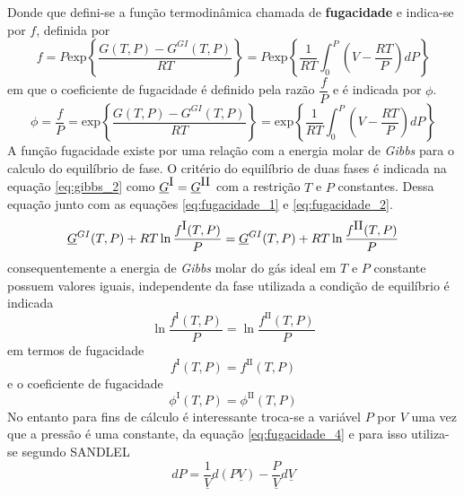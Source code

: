 Donde que defini-se a função termodinâmica chamada de \textbf{fugacidade} e indica-se por $f$, definida por
\begin{equation}\label{eq:fugacidade_1}
f=P\mbox{exp}\left\{\dfrac{G(T,P)-G^{GI}(T,P)}{RT}\right\} =P\mbox{exp}\left\{\dfrac{1}{RT}\int_{0}^{P}\left(V-\dfrac{RT}{P}\right)dP\right\}
\end{equation}
em que o coeficiente de fugacidade é definido pela razão $\dfrac{f}{P}$ e é indicada por $\phi$.
\begin{equation}\label{eq:fugacidade_2}
\phi=\dfrac{f}{P}=\mbox{exp}\left\{\dfrac{G(T,P)-G^{GI}(T,P)}{RT}\right\} =\mbox{exp}\left\{\dfrac{1}{RT}\int_{0}^{P}\left(V-\dfrac{RT}{P}\right)dP\right\}
\end{equation}
A função fugacidade existe por uma relação com a energia molar de \textit{Gibbs} para o calculo do equilíbrio de fase. O critério do equilíbrio de duas fases é indicada na equação \ref{eq:gibbs_2} como $\underline{G}^{\mbox{I}}=\underline{G}^{\mbox{II}}$ com a restrição $T$ e $P$ constantes. Dessa equação junto com as equações \ref{eq:fugacidade_1} e \ref{eq:fugacidade_2}. 
\begin{equation}\label{eq:fugacidade_3}
\underline{G}^{GI}(T,P) + RT\ln\dfrac{f^{\mbox{I}}(T,P)}{P} = \underline{G}^{GI}(T,P) + RT\ln\dfrac{f^{\mbox{II}}(T,P)}{P}
\end{equation}
consequentemente a energia de \textit{Gibbs} molar do gás ideal em $T$ e $P$ constante possuem valores iguais, independente da fase utilizada a condição de equilíbrio é indicada
\begin{equation}\label{eq:fugacidade_4}
\ln\dfrac{f^{\mbox{I}}(T,P)}{P} = \ln\dfrac{f^{\mbox{II}}(T,P)}{P}
\end{equation}
em termos de fugacidade
\begin{equation}\label{eq:fugacidade_5}
f^{\mbox{I}}(T,P) = f^{\mbox{II}}(T,P)
\end{equation}
e o coeficiente de fugacidade
\begin{equation}\label{eq:fugacidade_6}
\phi^{\mbox{I}}(T,P) = \phi^{\mbox{II}}(T,P)
\end{equation}
No entanto para fins de cálculo é interessante troca-se a variável $P$ por $V$ uma vez que a pressão é uma constante, da equação \ref{eq:fugacidade_4} e para isso utiliza-se segundo SANDLEL \citeyear{Sandlel}
\begin{equation}\label{eq:fugacidade_7}
dP=\dfrac{1}{\underline{V}}d(P\underline{V})-\dfrac{P}{\underline{V}}d\underline{V}
\end{equation}
